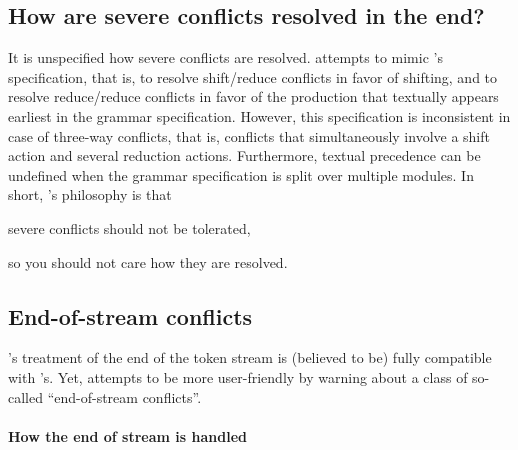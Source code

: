 \documentclass[onecolumn,11pt,nocopyrightspace,preprint]{sigplanconf}
\begin{document}
\subsection{How are severe conflicts resolved in the end?}

It is unspecified how severe conflicts are resolved. \menhir attempts to mimic
\ocamlyacc's specification, that is, to resolve shift/reduce conflicts in favor
of shifting, and to resolve reduce/reduce conflicts in favor of the production
that textually appears earliest in the grammar specification. However, this
specification is inconsistent in case of three-way conflicts, that is,
conflicts that simultaneously involve a shift action and several reduction
actions. Furthermore, textual precedence can be undefined when the grammar
specification is split over multiple modules. In short, \menhir's philosophy is
that
\begin{center}
severe conflicts should not be tolerated,
\end{center}
so you should not care how they are resolved.


\subsection{End-of-stream conflicts}
\label{sec:eos}

\menhir's treatment of the end of the token stream is (believed to be) fully compatible
with \ocamlyacc's. Yet, \menhir attempts to be more user-friendly by warning
about a class of so-called ``end-of-stream conflicts''.


\paragraph{How the end of stream is handled}
\end{document}

